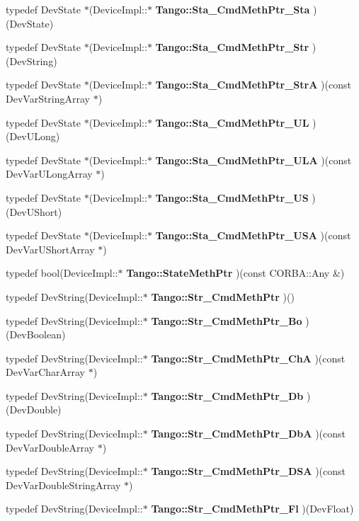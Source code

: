 \begin{DoxyCompactItemize}
\item 
typedef Dev\-State $\ast$(Device\-Impl\-::$\ast$ {\bf Tango\-::\-Sta\-\_\-\-Cmd\-Meth\-Ptr\-\_\-\-Sta} )(Dev\-State)
\item 
typedef Dev\-State $\ast$(Device\-Impl\-::$\ast$ {\bf Tango\-::\-Sta\-\_\-\-Cmd\-Meth\-Ptr\-\_\-\-Str} )(Dev\-String)
\item 
typedef Dev\-State $\ast$(Device\-Impl\-::$\ast$ {\bf Tango\-::\-Sta\-\_\-\-Cmd\-Meth\-Ptr\-\_\-\-Str\-A} )(const Dev\-Var\-String\-Array $\ast$)
\item 
typedef Dev\-State $\ast$(Device\-Impl\-::$\ast$ {\bf Tango\-::\-Sta\-\_\-\-Cmd\-Meth\-Ptr\-\_\-\-U\-L} )(Dev\-U\-Long)
\item 
typedef Dev\-State $\ast$(Device\-Impl\-::$\ast$ {\bf Tango\-::\-Sta\-\_\-\-Cmd\-Meth\-Ptr\-\_\-\-U\-L\-A} )(const Dev\-Var\-U\-Long\-Array $\ast$)
\item 
typedef Dev\-State $\ast$(Device\-Impl\-::$\ast$ {\bf Tango\-::\-Sta\-\_\-\-Cmd\-Meth\-Ptr\-\_\-\-U\-S} )(Dev\-U\-Short)
\item 
typedef Dev\-State $\ast$(Device\-Impl\-::$\ast$ {\bf Tango\-::\-Sta\-\_\-\-Cmd\-Meth\-Ptr\-\_\-\-U\-S\-A} )(const Dev\-Var\-U\-Short\-Array $\ast$)
\item 
typedef bool(Device\-Impl\-::$\ast$ {\bf Tango\-::\-State\-Meth\-Ptr} )(const C\-O\-R\-B\-A\-::\-Any \&)
\item 
typedef Dev\-String(Device\-Impl\-::$\ast$ {\bf Tango\-::\-Str\-\_\-\-Cmd\-Meth\-Ptr} )()
\item 
typedef Dev\-String(Device\-Impl\-::$\ast$ {\bf Tango\-::\-Str\-\_\-\-Cmd\-Meth\-Ptr\-\_\-\-Bo} )(Dev\-Boolean)
\item 
typedef Dev\-String(Device\-Impl\-::$\ast$ {\bf Tango\-::\-Str\-\_\-\-Cmd\-Meth\-Ptr\-\_\-\-Ch\-A} )(const Dev\-Var\-Char\-Array $\ast$)
\item 
typedef Dev\-String(Device\-Impl\-::$\ast$ {\bf Tango\-::\-Str\-\_\-\-Cmd\-Meth\-Ptr\-\_\-\-Db} )(Dev\-Double)
\item 
typedef Dev\-String(Device\-Impl\-::$\ast$ {\bf Tango\-::\-Str\-\_\-\-Cmd\-Meth\-Ptr\-\_\-\-Db\-A} )(const Dev\-Var\-Double\-Array $\ast$)
\item 
typedef Dev\-String(Device\-Impl\-::$\ast$ {\bf Tango\-::\-Str\-\_\-\-Cmd\-Meth\-Ptr\-\_\-\-D\-S\-A} )(const Dev\-Var\-Double\-String\-Array $\ast$)
\item 
typedef Dev\-String(Device\-Impl\-::$\ast$ {\bf Tango\-::\-Str\-\_\-\-Cmd\-Meth\-Ptr\-\_\-\-Fl} )(Dev\-Float)
\item 

\end{DoxyCompactItemize}
